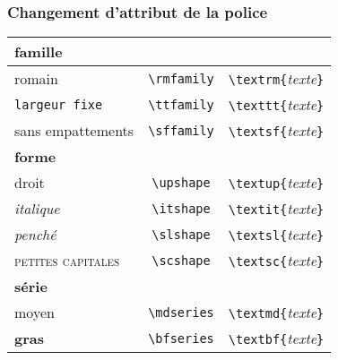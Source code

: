 \begin{frame}[c]

	\frametitle{Changement d'attribut de la police}
	
	\begin{center}
		\begin{tabular}{lcc}
			\hline\hline		
			\textbf{famille}			&										&	\\
			\hline
			\textrm{romain}				&	\texttt{\textbackslash rmfamily}	&	\texttt{\textbackslash textrm\{}\emph{texte}\texttt{\}} \\
			\texttt{largeur fixe}		&	\texttt{\textbackslash ttfamily}	&	\texttt{\textbackslash texttt\{}\emph{texte}\texttt{\}} \\
			\textsf{sans empattements}	&	\texttt{\textbackslash sffamily}	&	\texttt{\textbackslash textsf\{}\emph{texte}\texttt{\}} \\
			\hline
			\textbf{forme}				&										&	\\
			\hline
			\textup{droit}				&	\texttt{\textbackslash upshape}		&	\texttt{\textbackslash textup\{}\emph{texte}\texttt{\}} \\
			\textit{italique}			&	\texttt{\textbackslash itshape}		&	\texttt{\textbackslash textit\{}\emph{texte}\texttt{\}} \\
			\textsl{penché}				&	\texttt{\textbackslash slshape}		&	\texttt{\textbackslash textsl\{}\emph{texte}\texttt{\}} \\
			\textsc{petites capitales}	&	\texttt{\textbackslash scshape}		&	\texttt{\textbackslash textsc\{}\emph{texte}\texttt{\}} \\
			\hline
			\textbf{série}				&										&	\\
			\hline
			\textmd{moyen}				&	\texttt{\textbackslash mdseries}	&	\texttt{\textbackslash textmd\{}\emph{texte}\texttt{\}} \\
			\textbf{gras}				&	\texttt{\textbackslash bfseries}	&	\texttt{\textbackslash textbf\{}\emph{texte}\texttt{\}} \\
			\hline\hline
		\end{tabular}
	\end{center}
\end{frame}


